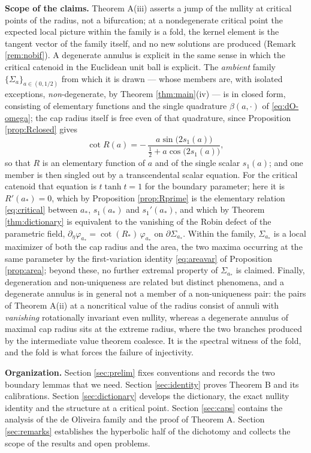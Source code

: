 \documentclass[11pt,a4paper]{amsart}
\theoremstyle{plain}
\theoremstyle{definition}
\begin{document}
\medskip
\noindent\textbf{Scope of the claims.} Theorem A(iii) asserts a jump of the nullity at critical points of the radius, not a bifurcation; at a nondegenerate critical point the expected local picture within the family is a fold, the kernel element is the tangent vector of the family itself, and no new solutions are produced (Remark \ref{rem:nobif}). A degenerate annulus is explicit in the same sense in which the critical catenoid in the Euclidean unit ball is explicit. The \emph{ambient} family $\{\Sigma_a\}_{a\in(0,1/2)}$ from which it is drawn --- whose members are, with isolated exceptions, \emph{non}-degenerate, by Theorem \ref{thm:main}(iv) --- is in closed form, consisting of elementary functions and the single quadrature $\beta(a,\cdot)$ of \eqref{eq:dO-omega}; the cap radius itself is free even of that quadrature, since Proposition \ref{prop:Rclosed} gives
\[
\cot R(a)=-\,\frac{a\sin\bigl(2s_1(a)\bigr)}{\tfrac12+a\cos\bigl(2s_1(a)\bigr)},
\]
so that $R$ is an elementary function of $a$ and of the single scalar $s_1(a)$; and one member is then singled out by a transcendental scalar equation. For the critical catenoid that equation is $t\tanh t=1$ for the boundary parameter; here it is $R'(a_*)=0$, which by Proposition \ref{prop:Rprime} is the elementary relation \eqref{eq:critical} between $a_*$, $s_1(a_*)$ and $s_1'(a_*)$, and which by Theorem \ref{thm:dictionary} is equivalent to the vanishing of the Robin defect of the parametric field, $\partial_\eta\varphi_{a_*}=\cot(R_*)\,\varphi_{a_*}$ on $\partial\Sigma_{a_*}$. Within the family, $\Sigma_{a_*}$ is a local maximizer of both the cap radius and the area, the two maxima occurring at the same parameter by the first-variation identity \eqref{eq:areavar} of Proposition \ref{prop:area}; beyond these, no further extremal property of $\Sigma_{a_*}$ is claimed. Finally, degeneration and non-uniqueness are related but distinct phenomena, and a degenerate annulus is in general not a member of a non-uniqueness pair: the pairs of Theorem A(ii) at a noncritical value of the radius consist of annuli with \emph{vanishing} rotationally invariant even nullity, whereas a degenerate annulus of maximal cap radius sits at the extreme radius, where the two branches produced by the intermediate value theorem coalesce. It is the spectral witness of the fold, and the fold is what forces the failure of injectivity.

\medskip
\noindent\textbf{Organization.} Section \ref{sec:prelim} fixes conventions and records the two boundary lemmas that we need. Section \ref{sec:identity} proves Theorem B and its calibrations. Section \ref{sec:dictionary} develops the dictionary, the exact nullity identity and the structure at a critical point. Section \ref{sec:caps} contains the analysis of the de Oliveira family and the proof of Theorem A. Section \ref{sec:remarks} establishes the hyperbolic half of the dichotomy and collects the scope of the results and open problems.
\end{document}
